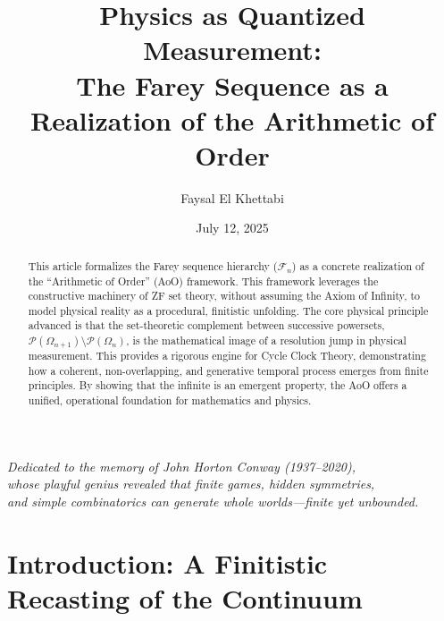 \documentclass[12pt,a4paper]{article}
\theoremstyle{plain}
\theoremstyle{definition}
\theoremstyle{remark}
\newcommand{\powerset}{\mathcal{P}}
\newcommand{\Fseq}[1]{\mathcal{F}_{#1}}      %
\begin{document}
\title{Physics as Quantized Measurement: \\ The Farey Sequence as a Realization of the Arithmetic of Order}
\author{Faysal El Khettabi}
\date{July 12, 2025}
\maketitle

\begin{center}
    \vspace{1em}
    \emph{Dedicated to the memory of John Horton Conway (1937–2020),}\\
    \emph{whose playful genius revealed that finite games, hidden symmetries,}\\
    \emph{and simple combinatorics can generate whole worlds—finite yet unbounded.}
    \vspace{1em}
\end{center}

\begin{abstract}
This article formalizes the Farey sequence hierarchy ($\Fseq{n}$) as a concrete realization of the \enquote{Arithmetic of Order} (AoO) framework. This framework leverages the constructive machinery of ZF set theory, without assuming the Axiom of Infinity, to model physical reality as a procedural, finitistic unfolding. The core physical principle advanced is that the set-theoretic complement between successive powersets, $\powerset(\Omega_{n+1}) \setminus \powerset(\Omega_n)$, is the mathematical image of a resolution jump in physical measurement. This provides a rigorous engine for Cycle Clock Theory, demonstrating how a coherent, non-overlapping, and generative temporal process emerges from finite principles. By showing that the infinite is an emergent property, the AoO offers a unified, operational foundation for mathematics and physics.
\end{abstract}

\tableofcontents

\section{Introduction: A Finitistic Recasting of the Continuum}
\end{document}
